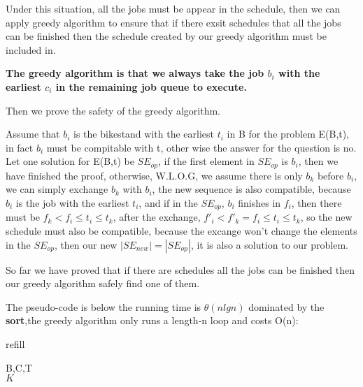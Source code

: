 \documentclass[oneside]{homework} %
\begin{document}
Under this situation, all the jobs must be appear in the schedule, then we can apply greedy algorithm to ensure that if there exsit schedules that all the jobs can be finished then the schedule created by our greedy algorithm must be included in.  

\textbf{The greedy algorithm is that we always take the job $b_{i}$ with the earliest $c_{i}$ in the remaining job queue to execute. }

Then we prove the safety of the greedy algorithm.

Assume that $b_{i}$ is the bikestand with the earliest $t_{i}$ in B for the problem E(B,t), in fact $b_{i}$ must be compitable with t, other wise the answer for the question is no. Let one solution for E(B,t) be $SE_{op}$, if the first element in $SE_{op}$ is $b_{i}$, then we have finished the proof, otherwise, W.L.O.G, we assume there is only $b_{k}$ before $b_{i}$, we can simply exchange $b_{k}$ with $b_{i}$, the new sequence is also compatible, because $b_{i}$ is the job with the earliest $t_{i}$, and if in the $SE_{op}$, $b_{i}$ finishes in $f_{i}$, then there must be $f_{k} < f_{i} \leq t_{i} \leq t_{k}$, after the exchange, $f'_{i}<f'_{k} =  f_{i} \leq t_{i} \leq t_{k}$, so the new schedule must also be compatible, because the excange won't change the elements in the $SE_{op}$, then our new $|SE_{new}| = |SE_{op}|$, it is also a solution to our problem.

So far we have proved that if there are schedules all the jobs can be finished then our greedy algorithm safely find one of them.

The pseudo-code is below the running time is $\theta(nlgn) $ dominated by the \textbf{sort},the greedy algorithm only runs a length-n loop and costs O(n):
\begin{algorithm}[h]
  \caption{refill}
  \label{algo:refill}
  \begin{algorithmic}[1]
	\REQUIRE B,C,T
	\ENSURE ~ ~\\ 
		\ELSE 
		\ENDIF
	\ENDWHILE
	\LASTCON $K$
  \end{algorithmic}
\end{algorithm} 
\end{document}

